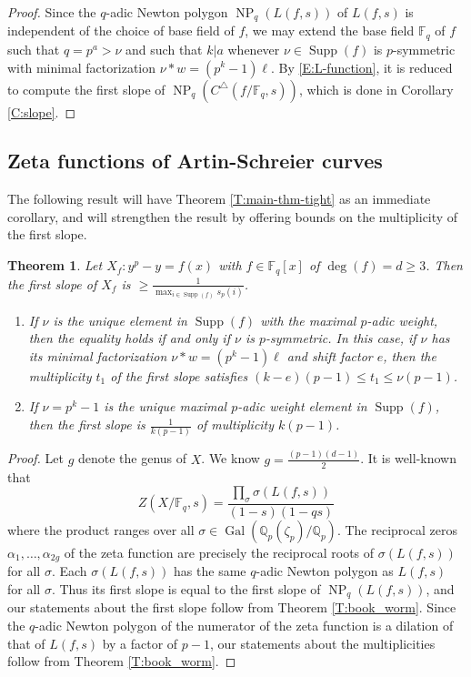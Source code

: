 \documentclass{amsart}
\numberwithin{equation}{section}
\newcommand{\Q}{\mathbb{Q}}
\newcommand{\F}{\mathbb{F}}
\DeclareMathOperator{\Gal}{Gal}
\DeclareMathOperator{\NP}{NP}
\DeclareMathOperator{\Supp}{Supp}
\theoremstyle{plain}
\newtheorem{theorem}{Theorem}[section]
\theoremstyle{definition}
\begin{document}
\begin{proof} 
Since the $q$-adic Newton polygon $\NP_q(L(f,s))$ 
of $L(f,s)$ is independent of the choice of base field of $f$, 
we may extend the base field $\F_q$ of $f$ such that 
$q=p^a>\nu$ and such that $k|a$ whenever 
$\nu\in\Supp(f)$ is $p$-symmetric with minimal factorization 
$\nu*w=(p^k-1)\ell$.
By \eqref{E:L-function}, it is reduced to compute the first slope of 
$\NP_q(C^\triangle(f/\F_q,s))$, 
which is done in Corollary \ref{C:slope}.
\end{proof}


\subsection{Zeta functions of Artin-Schreier curves}

The following result will have Theorem
\ref{T:main-thm-tight} as an immediate corollary, and will strengthen
the result by offering bounds on the multiplicity of the first slope.

\begin{theorem}\label{T:main!}
Let $X_f: y^p-y=f(x)$ with $f\in\F_q[x]$ of $\deg(f)=d\ge 3$.
Then the first slope of $X_f$ is
$\ge \frac{1}{\max_{i\in\Supp(f)} s_p(i)}$.
\begin{enumerate} 
\item If $\nu$ is the unique element in $\Supp(f)$ with the maximal $p$-adic weight, 
then the equality holds if and only if $\nu$ is $p$-symmetric.
In this case, if $\nu$ has its minimal factorization $\nu*w=(p^k-1)\ell$
and shift factor $e$, then 
the multiplicity $t_1$ of the first slope satisfies 
$(k-e)(p-1)\le t_1 \le \nu(p-1)$.
\item 
If $\nu=p^k-1$ is the unique maximal $p$-adic weight element in $\Supp(f)$, then 
the first slope is $\frac{1}{k(p-1)}$ of multiplicity $k(p-1)$. 
\end{enumerate}
\end{theorem}

\begin{proof}
Let $g$ denote the genus of $X$. We know $g=\frac{(p-1)(d-1)}{2}$.
It is well-known that 
$$
Z(X/\F_q,s)=\frac{\prod_{\sigma} \sigma(L(f,s))}{(1-s)(1-qs)}
$$
where the product ranges over all
$\sigma\in \Gal(\Q_p(\zeta_p)/\Q_p)$.
The reciprocal zeros $\alpha_1,\ldots,\alpha_{2g}$ of the zeta function are precisely the reciprocal
roots of $\sigma(L(f,s))$ for all $\sigma$.
Each $\sigma(L(f,s))$ has the same $q$-adic Newton polygon as $L(f,s)$ 
for all $\sigma$. Thus its first slope is equal to the first slope of $\NP_q(L(f,s))$, 
and our statements about the first slope follow from Theorem \ref{T:book_worm}. 
Since the $q$-adic Newton polygon of 
the numerator of the zeta function is a dilation of 
that of $L(f,s)$ by a factor of $p-1$,
our statements about the multiplicities follow 
from Theorem \ref{T:book_worm}.
\end{proof}
\end{document}
